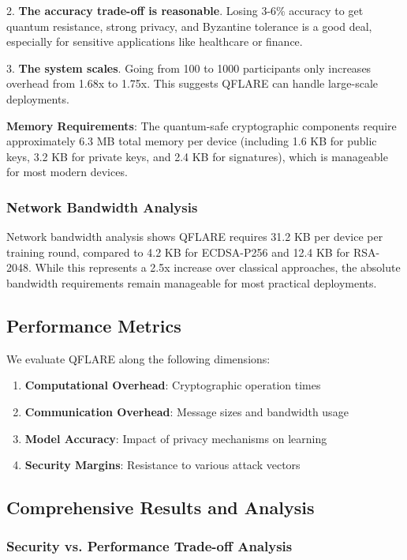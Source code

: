 \documentclass[journal,onecolumn]{IEEEtran}
\begin{document}
2. \textbf{The accuracy trade-off is reasonable}. Losing 3-6\% accuracy to get quantum resistance, strong privacy, and Byzantine tolerance is a good deal, especially for sensitive applications like healthcare or finance.

3. \textbf{The system scales}. Going from 100 to 1000 participants only increases overhead from 1.68x to 1.75x. This suggests QFLARE can handle large-scale deployments.

\textbf{Memory Requirements}: The quantum-safe cryptographic components require approximately 6.3 MB total memory per device (including 1.6 KB for public keys, 3.2 KB for private keys, and 2.4 KB for signatures), which is manageable for most modern devices.

\subsubsection{Network Bandwidth Analysis}

Network bandwidth analysis shows QFLARE requires 31.2 KB per device per training round, compared to 4.2 KB for ECDSA-P256 and 12.4 KB for RSA-2048. While this represents a 2.5x increase over classical approaches, the absolute bandwidth requirements remain manageable for most practical deployments.

\subsection{Performance Metrics}

We evaluate QFLARE along the following dimensions:

\begin{enumerate}
\item \textbf{Computational Overhead}: Cryptographic operation times
\item \textbf{Communication Overhead}: Message sizes and bandwidth usage
\item \textbf{Model Accuracy}: Impact of privacy mechanisms on learning
\item \textbf{Security Margins}: Resistance to various attack vectors
\end{enumerate}

\subsection{Comprehensive Results and Analysis}

\subsubsection{Security vs. Performance Trade-off Analysis}
\end{document}
